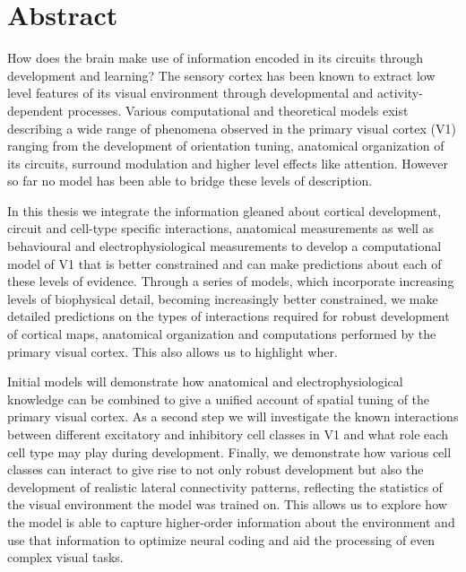 
\begingroup
\let\clearpage\relax
\let\cleardoublepage\relax
\let\cleardoublepage\relax

\chapter*{Abstract} %

How does the brain make use of information encoded in its circuits
through development and learning? The sensory cortex has been known to
extract low level features of its visual environment through
developmental and activity-dependent processes. Various computational
and theoretical models exist describing a wide range of phenomena
observed in the primary visual cortex (V1) ranging from the
development of orientation tuning, anatomical organization of its
circuits, surround modulation and higher level effects like
attention. However so far no model has been able to bridge these
levels of description.

In this thesis we integrate the information gleaned about cortical
development, circuit and cell-type specific interactions, anatomical
measurements as well as behavioural and electrophysiological
measurements to develop a computational model of V1 that is better
constrained and can make predictions about each of these levels of
evidence. Through a series of models, which incorporate increasing
levels of biophysical detail, becoming increasingly better
constrained, we make detailed predictions on the types of interactions
required for robust development of cortical maps, anatomical
organization and computations performed by the primary visual
cortex. This also allows us to highlight wher.

Initial models will demonstrate how anatomical and
electrophysiological knowledge can be combined to give a unified
account of spatial tuning of the primary visual cortex. As a second
step we will investigate the known interactions between different
excitatory and inhibitory cell classes in V1 and what role each cell
type may play during development. Finally, we demonstrate how various
cell classes can interact to give rise to not only robust development
but also the development of realistic lateral connectivity patterns,
reflecting the statistics of the visual environment the model was
trained on. This allows us to explore how the model is able to capture
higher-order information about the environment and use that
information to optimize neural coding and aid the processing of even
complex visual tasks.

\endgroup
